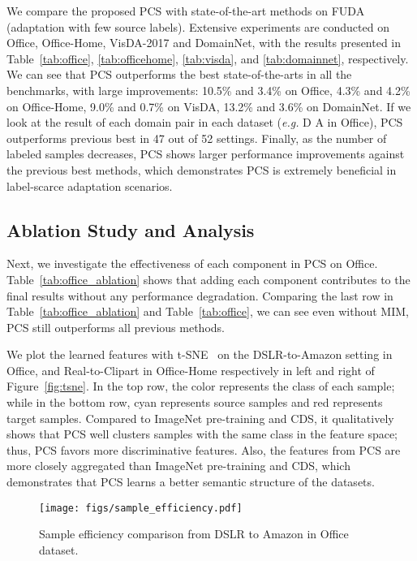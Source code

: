\documentclass[final]{cvpr}
\begin{document}
We compare the proposed PCS with state-of-the-art methods on FUDA (adaptation with few source labels). 
Extensive experiments are conducted on Office, Office-Home, VisDA-2017 and DomainNet, with the results presented in Table~\ref{tab:office}, \ref{tab:officehome}, \ref{tab:visda}, and \ref{tab:domainnet}, respectively. We can see that PCS outperforms the best state-of-the-arts in all the benchmarks, with large improvements: 10.5\%  and 3.4\% on Office, 4.3\% and 4.2\% on Office-Home, 9.0\% and 0.7\% on VisDA, 13.2\% and 3.6\% on DomainNet. If we look at the result of each domain pair in each dataset (\textit{e.g.} D  A in Office), PCS outperforms previous best in 47 out of 52 settings. Finally, as the number of labeled samples decreases, PCS shows larger performance improvements against the previous best methods, which demonstrates PCS is extremely beneficial in label-scarce adaptation scenarios. 


\subsection{Ablation Study and Analysis}
Next, we investigate the effectiveness of each component in PCS on Office.
Table~\ref{tab:office_ablation} shows 
that adding each component contributes to the final results without any performance degradation. Comparing the last row in Table~\ref{tab:office_ablation} and Table~\ref{tab:office}, we can see even without MIM, PCS still outperforms all previous methods. 

We plot the learned features with t-SNE~\cite{maaten2008visualizing} on the DSLR-to-Amazon setting in Office, and Real-to-Clipart in Office-Home respectively in left and right of Figure~\ref{fig:tsne}. In the top row, the color represents the class of each sample; while in the bottom row, cyan represents source samples and red represents target samples. 
Compared to ImageNet pre-training and CDS, it qualitatively shows that PCS well clusters samples with the same class in the feature space; thus, PCS favors more discriminative features. Also, the features from PCS are more closely aggregated than ImageNet pre-training and CDS, which demonstrates that PCS learns a better semantic structure of the datasets. 

\begin{figure}[t]
 \centering
\texttt{[image: figs/sample\_efficiency.pdf]}
 \caption{Sample efficiency comparison from DSLR to Amazon in Office dataset.}
 \label{fig:sample_efficiency_main}
\end{figure} 
\end{document}
